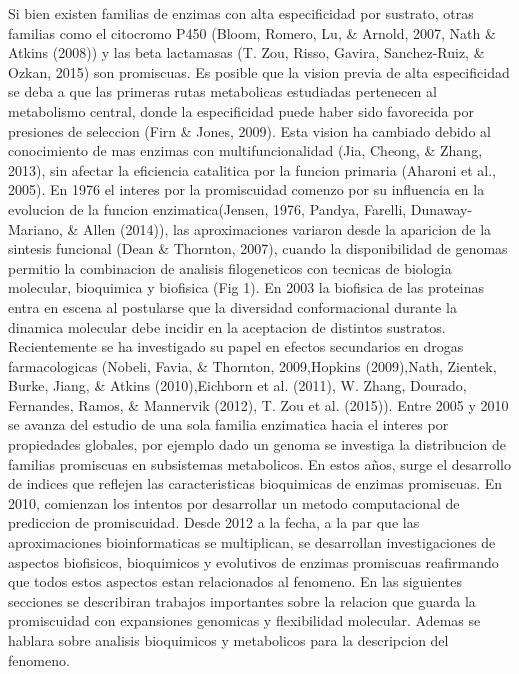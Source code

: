 \documentclass[12pt,twoside]{reedthesis}
\begin{document}
  Si bien existen familias de enzimas con alta especificidad por sustrato,
  otras familias como el citocromo P450 (Bloom, Romero, Lu, \& Arnold,
  2007, Nath \& Atkins (2008)) y las beta lactamasas (T. Zou, Risso,
  Gavira, Sanchez-Ruiz, \& Ozkan, 2015) son promiscuas. Es posible que la
  vision previa de alta especificidad se deba a que las primeras rutas
  metabolicas estudiadas pertenecen al metabolismo central, donde la
  especificidad puede haber sido favorecida por presiones de seleccion
  (Firn \& Jones, 2009). Esta vision ha cambiado debido al conocimiento de
  mas enzimas con multifuncionalidad (Jia, Cheong, \& Zhang, 2013), sin
  afectar la eficiencia catalitica por la funcion primaria (Aharoni et
  al., 2005). En 1976 el interes por la promiscuidad comenzo por su
  influencia en la evolucion de la funcion enzimatica(Jensen, 1976,
  Pandya, Farelli, Dunaway-Mariano, \& Allen (2014)), las aproximaciones
  variaron desde la aparicion de la sintesis funcional (Dean \& Thornton,
  2007), cuando la disponibilidad de genomas permitio la combinacion de
  analisis filogeneticos con tecnicas de biologia molecular, bioquimica y
  biofisica (Fig 1). En 2003 la biofisica de las proteinas entra en escena
  al postularse que la diversidad conformacional durante la dinamica
  molecular debe incidir en la aceptacion de distintos sustratos.
  Recientemente se ha investigado su papel en efectos secundarios en
  drogas farmacologicas (Nobeli, Favia, \& Thornton, 2009,Hopkins
  (2009),Nath, Zientek, Burke, Jiang, \& Atkins (2010),Eichborn et al.
  (2011), W. Zhang, Dourado, Fernandes, Ramos, \& Mannervik (2012), T. Zou
  et al. (2015)). Entre 2005 y 2010 se avanza del estudio de una sola
  familia enzimatica hacia el interes por propiedades globales, por
  ejemplo dado un genoma se investiga la distribucion de familias
  promiscuas en subsistemas metabolicos. En estos años, surge el
  desarrollo de indices que reflejen las caracteristicas bioquimicas de
  enzimas promiscuas. En 2010, comienzan los intentos por desarrollar un
  metodo computacional de prediccion de promiscuidad. Desde 2012 a la
  fecha, a la par que las aproximaciones bioinformaticas se multiplican,
  se desarrollan investigaciones de aspectos biofisicos, bioquimicos y
  evolutivos de enzimas promiscuas reafirmando que todos estos aspectos
  estan relacionados al fenomeno. En las siguientes secciones se
  describiran trabajos importantes sobre la relacion que guarda la
  promiscuidad con expansiones genomicas y flexibilidad molecular. Ademas
  se hablara sobre analisis bioquimicos y metabolicos para la descripcion
  del fenomeno.
  
\end{document}
